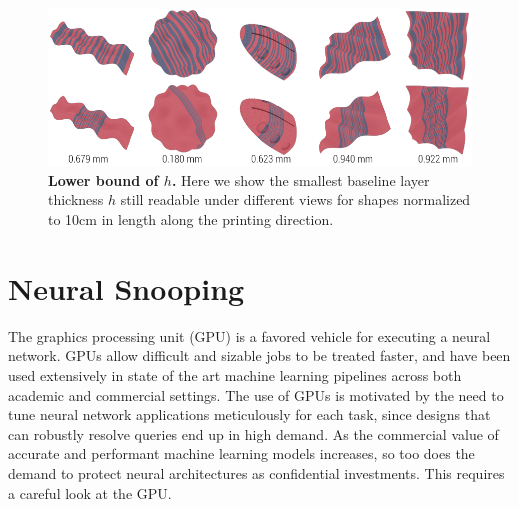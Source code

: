 \documentclass[12pt]{report}
\begin{document}
\begin{figure}[H]
    \centering
    \vspace{-2mm}
    \includegraphics[width=0.9\linewidth]{figs/hTestFig2.pdf}
    \vspace{-2mm}
    \caption{ \textbf{Lower bound of $h$.}
    Here we show the smallest baseline layer thickness $h$ still readable under different views for shapes normalized to 10cm in length along the printing direction.
    \label{fig:different_resolution}}
    \vspace{-2.5mm}
\end{figure}



\chapter{Neural Snooping}\label{snoop}
\vspace{-9mm}

The graphics processing unit (GPU) is a favored vehicle for executing a neural network. 
GPUs allow difficult and sizable jobs to be treated faster, 
and have been used extensively in state of the art machine learning
pipelines across both academic and commercial settings.
The use of GPUs is motivated by the need to tune
neural network applications meticulously for each task, since designs
that can robustly resolve queries end up in high demand.
As the commercial value of accurate and performant machine learning models increases,
so too does the demand to protect neural architectures as confidential investments.
This requires a careful look at the GPU.

\end{document}
